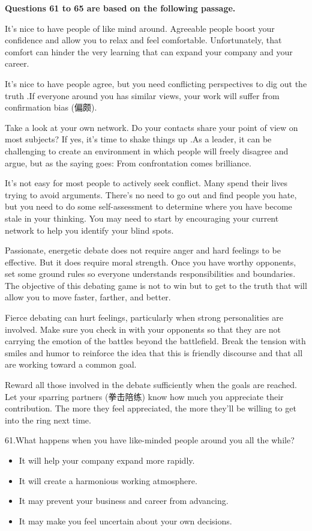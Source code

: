 \documentclass[UTF8,11pt]{ctexart}
\begin{document}
\textbf{Questions 61 to 65 are based on the following passage.}


It's nice to have people of like mind around. Agreeable people boost your confidence and allow you to relax and feel comfortable. Unfortunately, that comfort can hinder the very learning that can expand your company and your career.


It's nice to have people agree, but you need conflicting perspectives to dig out the truth .If everyone around you has similar views, your work will suffer from confirmation bias (偏颇).


Take a look at your own network. Do your contacts share your point of view on most subjects? If yes, it's time to shake things up .As a leader, it can be challenging to create an environment in which people will freely disagree and argue, but as the saying goes: From confrontation comes brilliance.


It's not easy for most people to actively seek conflict. Many spend their lives trying to avoid arguments. There's no need to go out and find people you hate, but you need to do some self-assessment to determine where you have become stale in your thinking. You may need to start by encouraging your current network to help you identify your blind spots.


Passionate, energetic debate does not require anger and hard feelings to be effective. But it does require moral strength. Once you have worthy opponents, set some ground rules so everyone understands responsibilities and boundaries. The objective of this debating game is not to win but to get to the truth that will allow you to move faster, farther, and better.


Fierce debating can hurt feelings, particularly when strong personalities are involved. Make sure you check in with your opponents so that they are not carrying the emotion of the battles beyond the battlefield. Break the tension with smiles and humor to reinforce the idea that this is friendly discourse and that all are working toward a common goal.


Reward all those involved in the debate sufficiently when the goals are reached. Let your sparring partners (拳击陪练) know how much you appreciate their contribution. The more they feel appreciated, the more they'll be willing to get into the ring next time.


61.What happens when you have like-minded people around you all the while?


\begin{itemize}[leftmargin=2em,itemsep=.2em,topsep=.4em]\item[A.] It will help your company expand more rapidly.
\item[B.] It will create a harmonious working atmosphere.
\item[C.] It may prevent your business and career from advancing.
\item[D.] It may make you feel uncertain about your own decisions.
\end{itemize}
\end{document}

